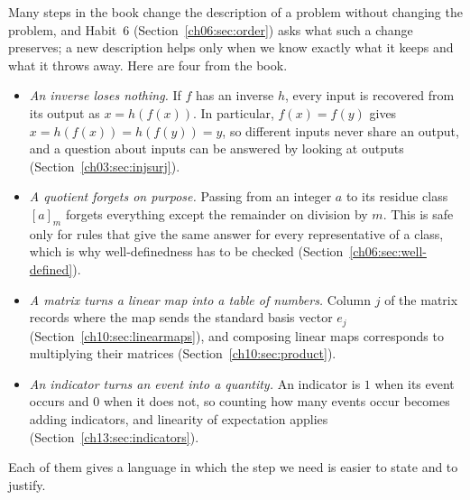 Many steps in the book change the description of a problem without changing the problem, and Habit~6 (Section~\ref{ch06:sec:order}) asks what such a change preserves; a new description helps only when we know exactly what it keeps and what it throws away. Here are four from the book.
\begin{itemize}
\item \emph{An inverse loses nothing.} If $f$ has an inverse $h$, every input is recovered from its output as $x=h(f(x))$. In particular, $f(x)=f(y)$ gives $x=h(f(x))=h(f(y))=y$, so different inputs never share an output, and a question about inputs can be answered by looking at outputs (Section~\ref{ch03:sec:injsurj}).
\item \emph{A quotient forgets on purpose.} Passing from an integer $a$ to its residue class $[a]_m$ forgets everything except the remainder on division by $m$. This is safe only for rules that give the same answer for every representative of a class, which is why well-definedness has to be checked (Section~\ref{ch06:sec:well-defined}).
\item \emph{A matrix turns a linear map into a table of numbers.} Column $j$ of the matrix records where the map sends the standard basis vector $e_j$ (Section~\ref{ch10:sec:linearmaps}), and composing linear maps corresponds to multiplying their matrices (Section~\ref{ch10:sec:product}).
\item \emph{An indicator turns an event into a quantity.} An indicator is $1$ when its event occurs and $0$ when it does not, so counting how many events occur becomes adding indicators, and linearity of expectation applies (Section~\ref{ch13:sec:indicators}).
\end{itemize}
Each of them gives a language in which the step we need is easier to state and to justify.
